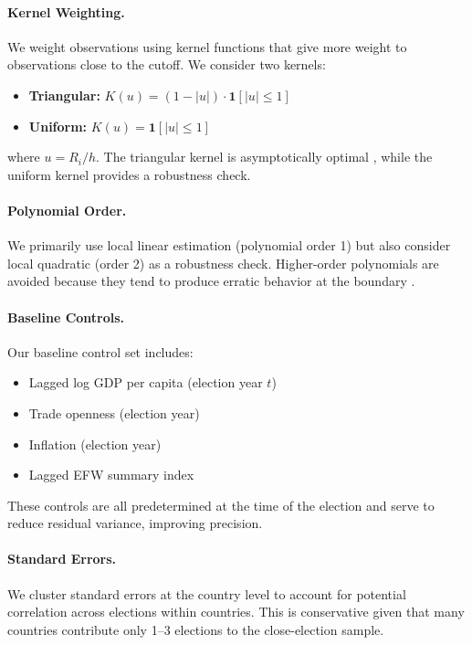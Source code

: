 \documentclass[12pt,a4paper]{article}
\begin{document}
\paragraph{Kernel Weighting.}
We weight observations using kernel functions that give more weight 
to observations close to the cutoff. We consider two kernels:
\begin{itemize}[noitemsep]
    \item \textbf{Triangular:} $K(u) = (1 - |u|) \cdot \mathbf{1}[|u| \leq 1]$
    \item \textbf{Uniform:} $K(u) = \mathbf{1}[|u| \leq 1]$
\end{itemize}
where $u = R_i / h$. The triangular kernel is asymptotically optimal 
\citep{cheng1997automatic}, while the uniform kernel provides a 
robustness check.

\paragraph{Polynomial Order.}
We primarily use local linear estimation (polynomial order 1) but also 
consider local quadratic (order 2) as a robustness check. Higher-order 
polynomials are avoided because they tend to produce erratic behavior 
at the boundary \citep{gelman2019high}.

\paragraph{Baseline Controls.}
Our baseline control set includes:
\begin{itemize}[noitemsep]
    \item Lagged log GDP per capita (election year $t$)
    \item Trade openness (election year)
    \item Inflation (election year)
    \item Lagged EFW summary index
\end{itemize}
These controls are all predetermined at the time of the election and 
serve to reduce residual variance, improving precision.

\paragraph{Standard Errors.}
We cluster standard errors at the country level to account for potential 
correlation across elections within countries. This is conservative given 
that many countries contribute only 1--3 elections to the close-election 
sample.
\end{document}
